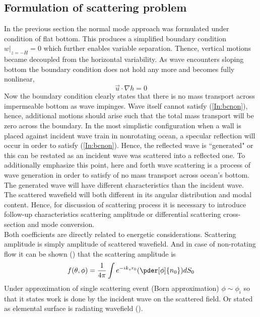 \subsection{Formulation of scattering problem}
In the previous section the normal mode approach was formulated under condition of flat bottom. This produces a simplified boundary condition $w|_{z = -H} = 0$ which further enables variable separation. Thence, vertical motions became decoupled from the horizontal variability. As wave encounters sloping bottom the boundary condition does not hold any more and becomes fully nonlinear,
\begin{equation}
\vec{u} \cdot \nabla h = 0 \label{In:bcnon}
\end{equation}
Now the boundary condition clearly states that there is no mass transport across impermeable bottom as wave impinges. Wave itself cannot satisfy (\ref{In:bcnon}), hence, additional motions should arise such that the total mass transport will be zero across the boundary. In the most simplistic configuration when a wall is placed against incident wave train in nonrotating ocean, a specular reflection will occur in order to satisfy (\ref{In:bcnon}). Hence, the reflected wave is ``generated" or this can be restated as an incident wave was scattered into a reflected one. To additionally emphasize this point, here and forth wave scattering is a process of wave generation in order to satisfy of no mass transport across ocean's bottom. The generated wave will have different characteristics than the incident wave. The scattered wavefield will both different in its angular distribution and modal content. Hence, for discussion of scattering process it is necessary to introduce follow-up characteristics scattering amplitude or differential scattering cross-section and mode conversion.\\
Both coefficients are directly related to energetic considerations. Scattering amplitude is simply amplitude of scattered wavefield. And in case of non-rotating flow it can be shown (\cite{morse1946methods}) that the scattering amplitude is
\begin{align}
f(\theta, \phi) = \frac{1}{4 \pi} \int e^{-i k_s r_0} (\pder[\phi]{n_0}) d S_0
\end{align}
Under approximation of single scattering event (Born approximation) $\phi \sim \phi_i$ so that it states work is done by the incident wave on the scattered field. Or stated as elemental surface is radiating wavefield (\cite{landau1988hydrodynamics}).\\
